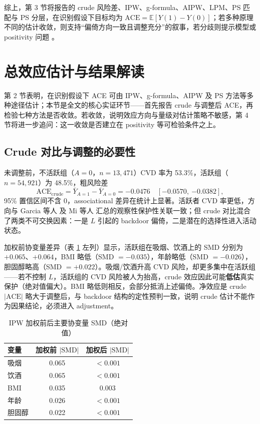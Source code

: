 \documentclass[12pt,a4paper]{article}
\newcommand{\E}{\mathbb{E}}
\begin{document}
综上，第 3 节将报告的 crude 风险差、IPW、g-formula、AIPW、LPM、PS 匹配与 PS 分层，在识别假设下目标均为 $\mathrm{ACE}=\E[Y(1)-Y(0)]$；若多种原理不同的估计收敛，则支持“偏倚方向一致且调整充分”的叙事，若分歧则提示模型或 positivity 问题 \cite{shahu2023comparison,hernan2024whatif}。

\section{总效应估计与结果解读}

第 2 节表明，在识别假设下 ACE 可由 IPW、g-formula、AIPW 及 PS 方法等多种途径估计；本节是全文的核心实证环节——首先报告 crude 与调整后 ACE，再检验七种方法是否收敛。若收敛，说明效应方向与量级对估计策略不敏感，第 4 节将进一步追问：这一收敛是否建立在 positivity 等可检验条件之上。

\subsection{Crude 对比与调整的必要性}

未调整前，不活跃组（$A=0$，$n=13{,}471$）CVD 率为 53.3\%，活跃组（$n=54{,}921$）为 48.5\%，粗风险差
\[
\mathrm{ACE}_{\text{crude}}=\bar Y_{A=1}-\bar Y_{A=0}=-0.0476\quad[{-0.0570},\ {-0.0382}],
\]
95\% 置信区间不含 0，associational 差异在统计上显著。活跃者 CVD 率更低，方向与 Garcia 等人 \cite{garcia2023meta} 及 Mi 等人 \cite{mi2025creview} 汇总的观察性保护性关联一致；但 crude 对比混合了两类不可交换因素：一是 $L$ 引起的 backdoor 偏倚，二是潜在的选择性进入活动状态。

加权前协变量差异（表 \ref{tab:balance} 左列）显示，活跃组在吸烟、饮酒上的 SMD 分别为 $+0.065$、$+0.064$，BMI 略低（SMD $=-0.035$），年龄略低（SMD $=-0.026$），胆固醇略高（SMD $=+0.022$）。吸烟/饮酒升高 CVD 风险，却更多集中在活跃组——若不控制 $L$，活跃组的 CVD 风险被人为抬高，crude 效应因此可能\textbf{低估}真实保护（绝对值偏大）。BMI 略低则相反，会部分抵消上述偏倚。净效应是 crude $|\mathrm{ACE}|$ 略大于调整后，与 backdoor 结构的定性预判一致，说明 crude 估计不能作为因果结论，必须进入 adjustment。

\begin{table}[H]
\centering
\caption{IPW 加权前后主要协变量 SMD（绝对值）}
\label{tab:balance}
\begin{tabular}{lcc}
\toprule
变量 & 加权前 $|\mathrm{SMD}|$ & 加权后 $|\mathrm{SMD}|$ \\
\midrule
吸烟     & 0.065 & $<0.001$ \\
饮酒     & 0.065 & $<0.001$ \\
BMI      & 0.035 & 0.003 \\
年龄     & 0.026 & $<0.001$ \\
胆固醇   & 0.022 & $<0.001$ \\
\bottomrule
\end{tabular}
\end{table}
\end{document}
